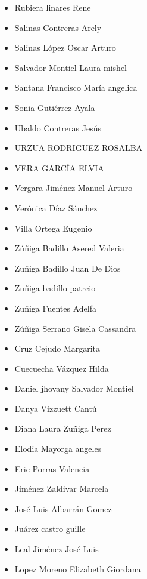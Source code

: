 \begin{spacing}{0.5}
\begin{paracol}{2}
\begin{itemize}
\item Rubiera linares Rene
\item Salinas Contreras Arely
\item Salinas López Oscar Arturo
\item Salvador Montiel Laura mishel
\item Santana Francisco María angelica
\item Sonia Gutiérrez Ayala
\item Ubaldo Contreras Jesús
\item URZUA RODRIGUEZ ROSALBA
\item VERA GARCÍA ELVIA
\item Vergara Jiménez Manuel Arturo
\item Verónica Díaz Sánchez
\item Villa Ortega Eugenio
\item Zúñiga Badillo Asered Valeria
\item Zuñiga Badillo Juan De Dios
\item Zuñiga badillo patrcio
\item Zuñiga Fuentes Adelfa
\item Zúñiga Serrano Gisela Cassandra
\item Cruz Cejudo Margarita
\item Cuecuecha Vázquez Hilda
\item Daniel jhovany Salvador Montiel
\item Danya Vizzuett Cantú
\item Diana Laura Zuñiga Perez
\item Elodia Mayorga angeles
\item Eric Porras Valencia
\item Jiménez Zaldivar Marcela
\item José Luis Albarrán Gomez
\item Juárez castro guille
\item Leal Jiménez José Luis
\item Lopez Moreno Elizabeth Giordana
\end{itemize}
\end{paracol}

\end{spacing}
